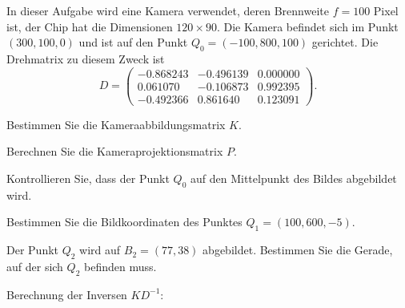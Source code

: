 In dieser Aufgabe wird eine Kamera verwendet, deren Brennweite $f=100$ Pixel ist,
der Chip hat die Dimensionen $120\times 90$.
Die Kamera befindet sich im Punkt $(300,100,0)$ und ist auf den Punkt
$Q_0=(-100,800,100)$ gerichtet.
Die Drehmatrix zu diesem Zweck ist 
\[
D=
\begin{pmatrix}
  -0.868243& -0.496139&  0.000000\\
   0.061070& -0.106873&  0.992395\\
  -0.492366&  0.861640&  0.123091
\end{pmatrix}.
\]
\begin{teilaufgaben}
\item Bestimmen Sie die Kameraabbildungsmatrix $K$.
\item Berechnen Sie die Kameraprojektionsmatrix $P$.
\item Kontrollieren Sie, dass der Punkt $Q_0$ auf den Mittelpunkt des
Bildes abgebildet wird.
\item Bestimmen Sie die Bildkoordinaten des Punktes
$Q_1 = (100,600,-5)$.
\item Der Punkt $Q_2$ wird auf $B_2=(77,38)$ abgebildet.
Bestimmen Sie die Gerade, auf der sich $Q_2$ befinden muss.
\end{teilaufgaben}

\begin{hinweis}
Berechnung der Inversen $KD^{-1}$: 
\end{hinweis}


